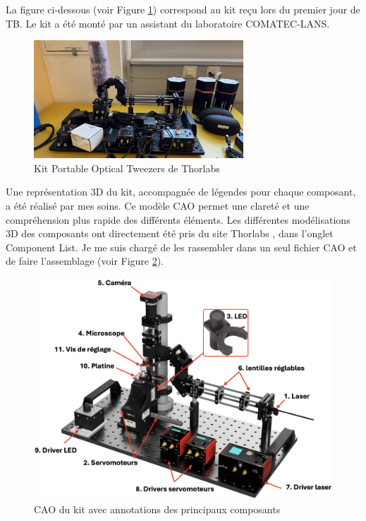 La figure ci-dessous (voir Figure \ref{kit_vierge}) correspond au kit reçu lors du premier jour de TB. Le kit a été monté par un assistant du laboratoire COMATEC-LANS.

\begin{figure}[H]
    \begin{center}
        \includegraphics[width=0.7\textwidth]{assets/figures/Introduction/kit_vierge.jpeg}
    \end{center}
    \caption{Kit Portable Optical Tweezers de Thorlabs}
    \label{kit_vierge}
\end{figure}

\newpage
Une représentation 3D du kit, accompagnée de légendes pour chaque composant, a été réalisé par mes soins. Ce modèle CAO permet une clareté et une compréhension plus rapide des différents éléments. Les différentes modélisations 3D des composants ont directement été pris du site Thorlabs \cite{noauthor_portable_nodate}, dans l'onglet \guillemotleft Component List\guillemetright. Je me suis chargé de les rassembler dans un seul fichier CAO et de faire l'assemblage (voir Figure \ref{kit_CAO_vierge_annote}).

\begin{figure}[H]
    \begin{center}
        \includegraphics[width=\textwidth]{assets/figures/Introduction/Kit_CAO_vierge_annote.png}
    \end{center}
    \caption{CAO du kit avec annotations des principaux composants}
    \label{kit_CAO_vierge_annote}
\end{figure}

